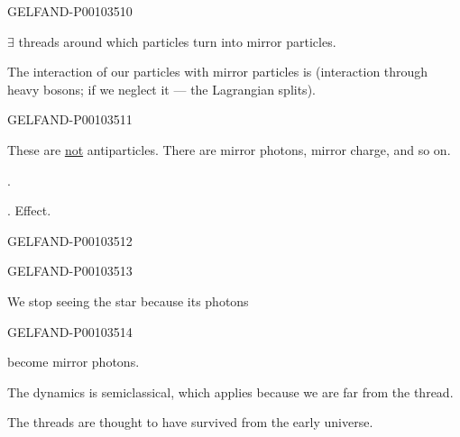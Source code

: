 \begin{GelfandAdjacentEvidence}{GELFAND-P001035}{10}

$\exists$ threads around which particles turn into mirror particles.

The interaction of our particles with mirror particles is  (interaction through heavy bosons; if we neglect it --- the Lagrangian splits).
\end{GelfandAdjacentEvidence}
\begin{GelfandAdjacentEvidence}{GELFAND-P001035}{11}


These are \underline{not} antiparticles. There are mirror photons, mirror charge, and so on.

.

. Effect.
\end{GelfandAdjacentEvidence}
\begin{GelfandAdjacentEvidence}{GELFAND-P001035}{12}


\end{GelfandAdjacentEvidence}
\begin{GelfandAdjacentEvidence}{GELFAND-P001035}{13}

We stop seeing the star because its photons
\end{GelfandAdjacentEvidence}
\begin{GelfandAdjacentEvidence}{GELFAND-P001035}{14}

become mirror photons.

The dynamics is semiclassical, which applies because we are far from the thread.

The threads are thought to have survived from the early universe.
\end{GelfandAdjacentEvidence}



